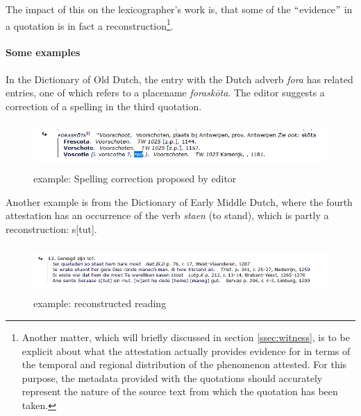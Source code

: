 \documentclass[10pt]{article}
\begin{document}
The impact of this on the lexicographer’s work is, that some of the $``$evidence$"$  in a quotation is in fact a reconstruction\footnote{Another matter, which will briefly discussed in section \ref{ssec:witness}, is to be explicit about what the attestation actually provides evidence for in terms of the temporal and regional distribution of the phenomenon attested. For this purpose, the metadata provided with the quotations should accurately represent the nature of the source text from which the quotation has been taken.}.\par



\paragraph*{Some examples}

 In the Dictionary of Old Dutch, the entry with the Dutch adverb \textit{fora }has related entries, one of which refers to a placename \textit{foraskōta}. The editor suggests a correction of a spelling in the third quotation.\par




\begin{figure}[H]
	\begin{Center}
		\includegraphics[width=6.27in,height=0.69in]{./image18.png}
	\end{Center}
	\caption{example: Spelling correction proposed by editor}
\end{figure}



 Another example is from the Dictionary of Early Middle Dutch, where the fourth attestation has an occurrence of the verb \textit{staen }(to stand), which is partly a reconstruction: s[tut].\par



\begin{figure}[H]
	\begin{Center}
		\includegraphics[width=6.27in,height=0.72in]{./image15.png}
	\end{Center}
	\caption{example: reconstructed reading}
\end{figure}
\end{document}

